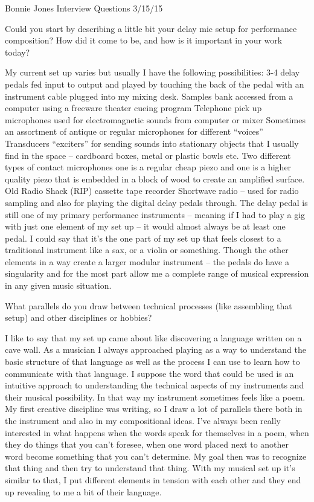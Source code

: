 Bonnie Jones Interview Questions 3/15/15

Could you start by describing a little bit your delay \/ mic setup for performance \/ composition? How did it come to be, and how is it important in your work today? 

My current set up varies but usually I have the following possibilities: 
3-4 delay pedals fed input to output and played by touching the back of the pedal with an instrument cable plugged into my mixing desk. 
Samples bank accessed from a computer using a freeware theater cueing program 
Telephone pick up microphones used for electromagnetic sounds from computer or mixer
Sometimes an assortment of antique or regular microphones for different “voices” 
Transducers “exciters” for sending sounds into stationary objects that I usually find in the space – cardboard boxes, metal or plastic bowls etc. 
Two different types of contact microphones one is a regular cheap piezo and one is a higher quality piezo that is embedded in a block of wood to create an amplified surface. 
Old Radio Shack (RIP) cassette tape recorder
Shortwave radio – used for radio sampling and also for playing the digital delay pedals through. 
The delay pedal is still one of my primary performance instruments – meaning if I had to play a gig with just one element of my set up – it would almost always be at least one pedal. I could say that it’s the one part of my set up that feels closest to a traditional instrument like a sax, or a violin or something. Though the other elements in a way create a larger modular instrument – the pedals do have a singularity and for the most part allow me a complete range of musical expression in any given music situation. 

What parallels do you draw between technical processes (like assembling that setup) and other disciplines or hobbies? 

I like to say that my set up came about like discovering a language written on a cave wall. As a musician I always approached playing as a way to understand the basic structure of that language as well as the process I can use to learn how to communicate with that language. I suppose the word that could be used is an intuitive approach to understanding the technical aspects of my instruments and their musical possibility. 
In that way my instrument sometimes feels like a poem. My first creative discipline was writing, so I draw a lot of parallels there both in the instrument and also in my compositional ideas. I’ve always been really interested in what happens when the words speak for themselves in a poem, when they do things that you can’t foresee, when one word placed next to another word become something that you can’t determine. My goal then was to recognize that thing and then try to understand that thing. With my musical set up it’s similar to that, I put different elements in tension with each other and they end up revealing to me a bit of their language.

